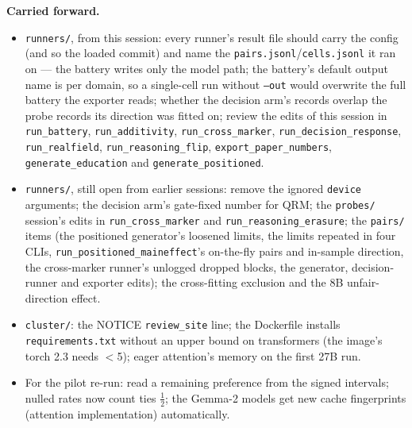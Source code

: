 \documentclass{article}
\begin{document}
\textbf{Carried forward.}
\begin{itemize}
  \item \texttt{runners/}, from this session: every runner's result file should carry the config (and so the loaded
        commit) and name the \texttt{pairs.jsonl}/\texttt{cells.jsonl} it ran on --- the battery writes only the
        model path; the battery's default output name is per domain, so a single-cell run without \texttt{--out}
        would overwrite the full battery the exporter reads; whether the decision arm's records overlap the probe
        records its direction was fitted on; review the edits of this session in \texttt{run\_battery},
        \texttt{run\_additivity}, \texttt{run\_cross\_marker}, \texttt{run\_decision\_response},
        \texttt{run\_realfield}, \texttt{run\_reasoning\_flip}, \texttt{export\_paper\_numbers},
        \texttt{generate\_education} and \texttt{generate\_positioned}.
  \item \texttt{runners/}, still open from earlier sessions: remove the ignored \texttt{device} arguments; the
        decision arm's gate-fixed number for QRM; the \texttt{probes/} session's edits in
        \texttt{run\_cross\_marker} and \texttt{run\_reasoning\_erasure}; the \texttt{pairs/} items (the positioned
        generator's loosened limits, the limits repeated in four CLIs, \texttt{run\_positioned\_maineffect}'s
        on-the-fly pairs and in-sample direction, the cross-marker runner's unlogged dropped blocks, the
        generator, decision-runner and exporter edits); the cross-fitting exclusion and the 8B unfair-direction
        effect.
  \item \texttt{cluster/}: the NOTICE \texttt{review\_site} line; the Dockerfile installs \texttt{requirements.txt}
        without an upper bound on transformers (the image's torch 2.3 needs $<$5); eager attention's memory on the
        first 27B run.
  \item For the pilot re-run: read a remaining preference from the signed intervals; nulled rates now count ties
        $\tfrac12$; the Gemma-2 models get new cache fingerprints (attention implementation) automatically.
\end{itemize}
\end{document}
